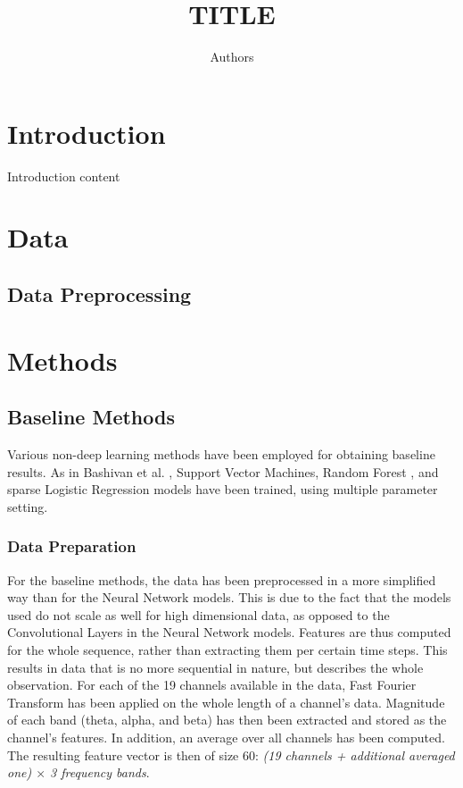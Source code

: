 \documentclass{article}
\title{TITLE}
\author{Authors}
\begin{document}
\maketitle
{}
	

\maketitle

\section{Introduction}
Introduction content

\section{Data}
\subsection{Data Preprocessing}


\section{Methods}
\subsection{Baseline Methods}
Various non-deep learning methods have been employed for obtaining baseline results.
As in Bashivan et al. \cite[pp. 7-8]{learning_eeg_repr}, Support Vector Machines, Random Forest \cite{random_forests}, and sparse Logistic Regression models have been trained, using multiple parameter setting.
\subsubsection{Data Preparation}
For the baseline methods, the data has been preprocessed in a more simplified way than for the Neural Network models. This is due to the fact that the models used do not scale as well for high dimensional data, as opposed to the Convolutional Layers in the Neural Network models. Features are thus computed for the whole sequence, rather than extracting them per certain time steps. This results in data that is no more sequential in nature, but describes the whole observation.
For each of the 19 channels available in the data, Fast Fourier Transform has been applied on the whole length of a channel's data. Magnitude of each band (theta, alpha, and beta) has then been extracted and stored as the channel's features. In addition, an average over all channels has been computed. The resulting feature vector is then of size 60: \textit{(19 channels + additional averaged one) $\times$ 3 frequency bands}.
\end{document}
